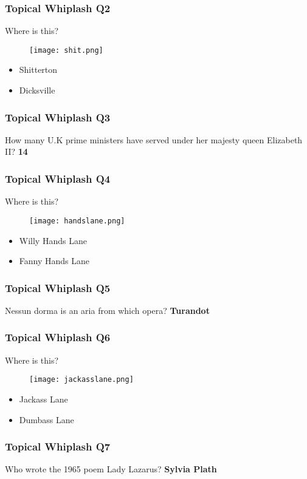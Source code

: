 \documentclass{beamer}
\begin{document}
\begin{frame}
\frametitle{Topical Whiplash Q2}
Where is this?
\begin{figure}[H]
\texttt{[image: shit.png]}
\end{figure}
\begin{itemize}
\item Shitterton \checkmark
\item Dicksville
\end{itemize}


\end{frame}


\begin{frame}
\frametitle{Topical Whiplash Q3}
How many U.K prime ministers have served under her majesty queen Elizabeth II?
\textbf{14}

\end{frame}

\begin{frame}
\frametitle{Topical Whiplash Q4}
Where is this?
\begin{figure}[H]
\texttt{[image: handslane.png]}
\end{figure}
\begin{itemize}
\item Willy Hands Lane 
\item Fanny Hands Lane \checkmark
\end{itemize}


\end{frame}



\begin{frame}
\frametitle{Topical Whiplash Q5}
Nessun dorma is an aria from which opera?
\textbf{Turandot}
\end{frame}

\begin{frame}
\frametitle{Topical Whiplash Q6}
Where is this?
\begin{figure}[H]
\texttt{[image: jackasslane.png]}
\end{figure}
\begin{itemize}
\item Jackass Lane \checkmark
\item Dumbass Lane 
\end{itemize}


\end{frame}

\begin{frame}
\frametitle{Topical Whiplash Q7}
Who wrote the 1965 poem Lady Lazarus?
\textbf{Sylvia Plath}
\end{frame}
\end{document}
